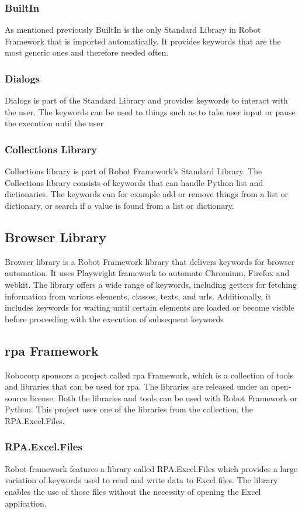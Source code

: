 \subsubsection{BuiltIn}
As mentioned previously BuiltIn is the only Standard Library in Robot Framework that is imported automatically.
It provides keywords that are the most generic ones and therefore needed often.
\cite{robotFramework:builtinLibrary}
\subsubsection{Dialogs}
Dialogs is part of the Standard Library and provides keywords to interact with the user. The keywords can be used to things such as to take user input or pause the execution until the user 
\cite{robotFramework:dialogsLibrary}

\subsubsection{Collections Library}
Collections library is part of Robot Framework's Standard Library.
The Collections library consists of keywords that can handle Python list and dictionaries.
The keywords can for example add or remove things from a list or dictionary, or search if a value is found from a list or dictionary.
\cite{robotFramework:collectionsLibrary}

\subsection{Browser Library}
Browser library is a Robot Framework library that delivers keywords for browser automation.
It uses Playwright framework to automate Chromium, Firefox and webkit.
The library offers a wide range of keywords, including getters for fetching information from various elements, classes, texts, and \gls{url}s.
Additionally, it includes keywords for waiting until certain elements are loaded or become visible before proceeding with the execution of subsequent keywords
\cite{robotFramework:browserLibrary}

\subsection{\gls{rpa} Framework}
Robocorp sponsors a  project called \gls{rpa} Framework, which is a collection of tools and libraries that can be used for \gls{rpa}\cite{robotFramwework:rpaFramework}.
The libraries are released under an open-source license.
Both the libraries and tools can be used with Robot Framework or Python.
This project uses one of the libraries from the collection, the RPA.Excel.Files.
\subsubsection{RPA.Excel.Files}
Robot framework features a library called RPA.Excel.Files which provides a large variation of keywords used to read and write data to Excel files.
The library enables the use of those files without the necessity of opening the Excel application.
\cite{rpaFramework:excelFiles}

\clearpage %
